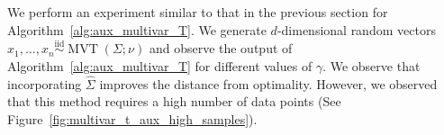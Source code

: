 \documentclass[sn-nature]{sn-jnl}%
\theoremstyle{thmstyleone}%
\theoremstyle{thmstyletwo}%
\theoremstyle{thmstylethree}%
\begin{document}


 We perform an experiment similar to that in the previous section for Algorithm~\ref{alg:aux_multivar_T}.
 We generate $d$-dimensional random vectors $x_1, \ldots, x_n \stackrel{\text{iid}}{\sim} \operatorname{MVT}(\Sigma; \nu)$ and observe the output of Algorithm~\ref{alg:aux_multivar_T} for different values of $\gamma$. We observe that incorporating $\hat{\Sigma}$ improves the distance from optimality. However, we observed that this method requires a high number of data points (See Figure~\ref{fig:multivar_t_aux_high_samples}).
\end{document}
